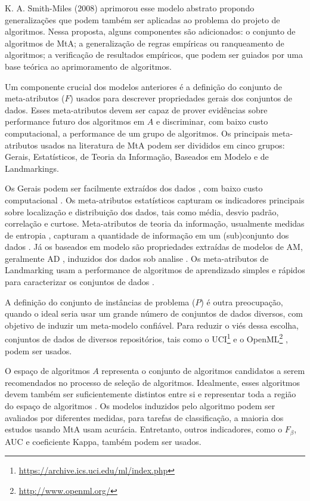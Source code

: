 K. A. Smith-Miles (2008) \cite{SmithMiles2008} aprimorou esse modelo abstrato
propondo generalizações que podem também ser aplicadas ao problema do projeto
de algoritmos.  Nessa proposta, alguns componentes são adicionados: o conjunto
de algoritmos de MtA; a generalização de regras empíricas ou ranqueamento de
algoritmos; a verificação de resultados empíricos, que podem ser guiados por
uma base teórica ao aprimoramento de algoritmos.

Um componente crucial dos modelos anteriores é a definição do conjunto de
meta-atributos ($F$) usados para descrever propriedades gerais dos conjuntos de
dados. Esses meta-atributos devem ser capaz de prover evidências sobre
performance futuro dos algoritmos em $A$ \cite{Soares2001, Reif2012} e
discriminar, com baixo custo computacional, a performance de um grupo de
algoritmos. Os principais meta-atributos usados na literatura de MtA podem ser
divididos em cinco grupos: Gerais, Estatísticos, de Teoria da Informação,
Baseados em Modelo e de Landmarkings.

Os Gerais podem ser facilmente extraídos dos dados \cite{Reif2014}, com baixo
custo computacional \cite{Reif2012}.
Os meta-atributos estatísticos capturam os indicadores principais sobre
localização e distribuição dos dados, tais como média, desvio padrão,
correlação e curtose.
Meta-atributos de teoria da informação, usualmente medidas de entropia
\cite{Segrera2008}, capturam a quantidade de informação em um (sub)conjunto dos
dados \cite{SmithMiles2008}.
Já os baseados em modelo são propriedades extraídas de modelos de AM,
geralmente AD \cite{Bensusan2000, Peng2002}, induzidos dos dados sob analise
\cite{Reif2014}.
Os meta-atributos de Landmarking usam a performance de algoritmos de
aprendizado simples e rápidos para caracterizar os conjuntos de dados
\cite{SmithMiles2008}.

A definição do conjunto de instâncias de problema ($P$) é outra preocupação,
quando o ideal seria usar um grande número de conjuntos de dados diversos, com
objetivo de induzir um meta-modelo confiável.
Para reduzir o viés dessa escolha, conjuntos de dados de diversos repositórios,
tais como o UCI\footnote{\url{https://archive.ics.uci.edu/ml/index.php}}
\cite{Lichman2013} e o OpenML\footnote{\url{http://www.openml.org/}}
\cite{OpenML2013}, podem ser usados.

O espaço de algoritmos $A$ representa o conjunto de algoritmos candidatos a
serem recomendados no processo de seleção de algoritmos.
Idealmente, esses algoritmos devem também ser suficientemente distintos entre
si e representar toda a região do espaço de algoritmos \cite{Munoz2018}.
Os modelos induzidos pelo algoritmo podem ser avaliados por diferentes medidas,
para tarefas de classificação, a maioria dos estudos usando MtA usam acurácia.
Entretanto, outros indicadores, como o $F_\beta$, AUC e coeficiente Kappa,
também podem ser usados.

